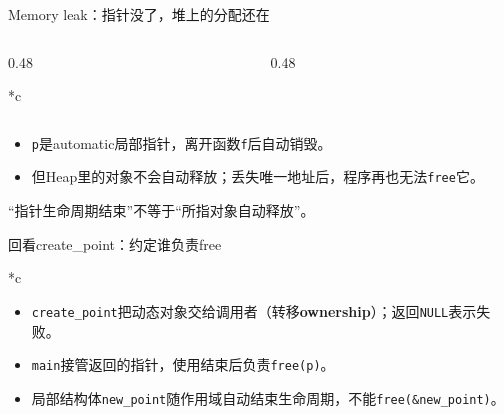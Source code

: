 \begin{frame}{Memory leak：指针没了，堆上的分配还在}
\begin{columns}[c]
\begin{column}{0.48\textwidth}
\begin{Code}*{c}\end{Code}
\end{column}
\begin{column}{0.48\textwidth}
\centering
{}
\end{column}
\end{columns}
\medskip
\begin{itemize}
\item \texttt{p}是automatic局部指针，离开函数\texttt{f}后自动销毁。
\item 但Heap里的对象不会自动释放；丢失唯一地址后，程序再也无法\texttt{free}它。
\end{itemize}
\alert{“指针生命周期结束”不等于“所指对象自动释放”。}
\end{frame}

\begin{frame}{回看create\_point：约定谁负责free}
\begin{Code}*{c}\end{Code}
\begin{itemize}
    \item \texttt{create\_point}把动态对象交给调用者（转移\textbf{ownership}）；返回\texttt{NULL}表示失败。
    \item \texttt{main}接管返回的指针，使用结束后负责\texttt{free(p)}。
    \item 局部结构体\texttt{new\_point}随作用域自动结束生命周期，不能\texttt{free(\&new\_point)}。
\end{itemize}
\end{frame}

